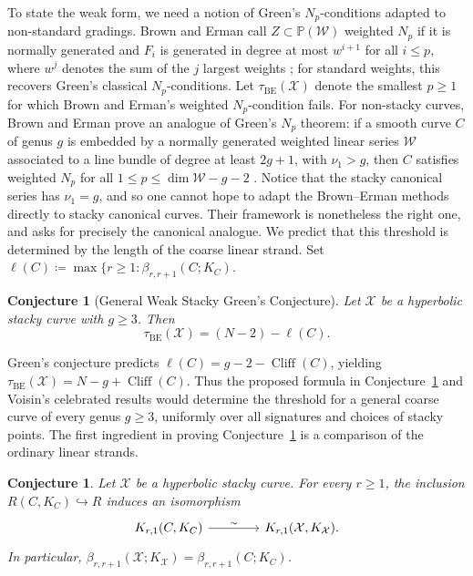 \documentclass[11pt,reqno]{amsart}
\newtheorem{conjecture}[lemma]{Conjecture}
\theoremstyle{remark}
\newcommand{\defi}[1]{\textsf{#1}} %
\newcommand{\cliff}{\operatorname{Cliff}}
\newcommand{\BE}{\operatorname{BE}}
\newcommand{\PP}{\mathbb{P}}
\newcommand{\cW}{\mathcal{W}}
\newcommand{\cX}{\mathcal{X}}
\begin{document}
To state the weak form, we need a notion of Green's $N_p$-conditions adapted to non-standard gradings. Brown and Erman call $Z\subset\PP(\cW)$ \defi{weighted $N_p$} if it is normally generated and $F_i$ is generated in degree at most $w^{i+1}$ for all $i\leq p$, where $w^j$ denotes the sum of the $j$ largest weights \cite[Def.~1.2]{brownErman25}; for standard weights, this recovers Green's classical $N_p$-conditions. Let $\tau_{\BE}(\cX)$ denote the smallest $p\geq1$ for which Brown and Erman's weighted $N_p$-condition fails. For non-stacky curves, Brown and Erman prove an analogue of Green's $N_p$ theorem: if a smooth curve $C$ of genus $g$ is embedded by a normally generated weighted linear series $\cW$ associated to a line
bundle of degree at least $2g+1$, with $\nu_1>g$, then $C$ satisfies weighted $N_p$ for all $1\leq p\leq \dim\cW-g-2$ \cite[Thm.~1.7]{brownErman25}. Notice that the stacky canonical series has $\nu_1=g$, and so one cannot hope to adapt the Brown--Erman methods directly to stacky canonical curves. Their framework is nonetheless the right one, and \cite[Question 7.7]{brownErman25} asks for precisely the canonical analogue. We predict that this threshold is determined by the length of the coarse linear strand. Set $\ell(C)\coloneqq\max\{r\geq1:\beta_{r,r+1}(C;K_C)$.

\begin{conjecture}[General Weak Stacky Green's Conjecture]\label{con:WSGC}
Let $\cX$ be a hyperbolic stacky curve with $g\geq3$. Then
\[
\tau_{\BE}(\cX)=(N-2)-\ell(C).
\]
\end{conjecture}

Green's conjecture predicts $\ell(C)=g-2-\cliff(C)$, yielding $\tau_{\BE}(\cX)=N-g+\cliff(C)$. Thus the proposed formula in Conjecture~\ref{con:WSGC} and Voisin's celebrated results \cite{voisin02,voisin05} would determine the threshold for a general coarse curve of every genus $g\geq3$, uniformly over all signatures and choices of stacky points. The first ingredient in proving Conjecture~\ref{con:WSGC} is a comparison of the ordinary linear strands.

\begin{conjecture}\label{con:linear-strand}
Let $\cX$ be a hyperbolic stacky curve. For every $r\geq1$, the inclusion $R(C,K_C)\hookrightarrow R$ induces an isomorphism
\[
\begin{tikzcd}[row sep = .2em, column sep = 4em]
K_{r,1}(C,K_C) \arrow[r, "\sim"] & K_{r,1}(\cX,K_{\cX}).
\end{tikzcd}
\]
In particular, $\beta_{r,r+1}(\cX;K_{\cX})=\beta_{r,r+1}(C;K_C)$.
\end{conjecture}
\end{document}
